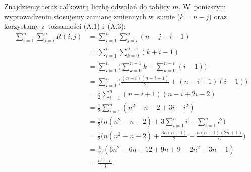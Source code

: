 Znajdziemy teraz całkowitą liczbę odwołań do tablicy $m$.
W~poniższym wyprowadzeniu stosujemy zamianę zmiennych w~sumie ($k=n-j$) oraz korzystamy z~tożsamości (A.1) i~(A.3):
\begin{align*}
	\sum_{i=1}^n\sum_{j=i}^nR(i,j) &= \sum_{i=1}^n\sum_{j=i}^n(n-j+i-1) \\
	&= \sum_{i=1}^n\sum_{k=0}^{n-i}(k+i-1) \\
	&= \sum_{i=1}^n\biggl(\sum_{k=0}^{n-1}k+\sum_{k=0}^{n-i}(i-1)\biggr) \\
	&= \sum_{i=1}^n\biggl(\frac{(n-i)(n-i+1)}{2}+(n-i+1)(i-1)\biggr) \\
	&= \frac{1}{2}\sum_{i=1}^n(n-i+1)(n-i+2i-2) \\
	&= \frac{1}{2}\sum_{i=1}^n(n^2-n-2+3i-i^2) \\
	&= \frac{1}{2}\biggl(n(n^2-n-2)+3\sum_{i=1}^ni-\sum_{i=1}^ni^2\biggr) \\
	&= \frac{1}{2}\biggl(n(n^2-n-2)+\frac{3n(n+1)}{2}-\frac{n(n+1)(2n+1)}{6}\biggr) \\
	&= \frac{n}{12}(6n^2-6n-12+9n+9-2n^2-3n-1) \\[1mm]
	&= \frac{n^3-n}{3}.
\end{align*}

\exercise %
